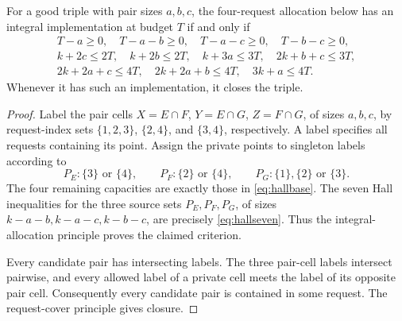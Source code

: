 \begin{lemma}\label{lem:hallstatic}
For a good triple with pair sizes $a,b,c$, the four-request allocation
below has an integral implementation at budget $T$ if and only if
\begin{gather}
 T-a\ge0,\quad T-a-b\ge0,\quad T-a-c\ge0,\quad T-b-c\ge0,
 \label{eq:hallbase}\\
 k+2c\le2T,\quad k+2b\le2T,\quad k+3a\le3T,\quad
 2k+b+c\le3T,\label{eq:hallseven}\\
 2k+2a+c\le4T,\quad2k+2a+b\le4T,\quad3k+a\le4T.\nonumber
\end{gather}
Whenever it has such an implementation, it closes the triple.
\end{lemma}
\begin{proof}
Label the pair cells $X=E\cap F$, $Y=E\cap G$, $Z=F\cap G$,
of sizes $a,b,c$, by request-index sets $\{1,2,3\}$, $\{2,4\}$,
and $\{3,4\}$, respectively. A label specifies all requests containing
its point. Assign the private points to singleton labels according to
\[
 P_E:\{3\}\text{ or }\{4\},\qquad
 P_F:\{2\}\text{ or }\{4\},\qquad
 P_G:\{1\},\{2\}\text{ or }\{3\}.
\]
The four remaining capacities are exactly those in
\eqref{eq:hallbase}. The seven Hall inequalities for the three source
sets $P_E,P_F,P_G$, of sizes $k-a-b,k-a-c,k-b-c$, are precisely
\eqref{eq:hallseven}. Thus the integral-allocation principle proves the
claimed criterion.

Every candidate pair has intersecting labels. The three pair-cell
labels intersect pairwise, and every allowed label of a private cell
meets the label of its opposite pair cell. Consequently every candidate
pair is contained in some request. The request-cover principle gives
closure.

\end{proof}


